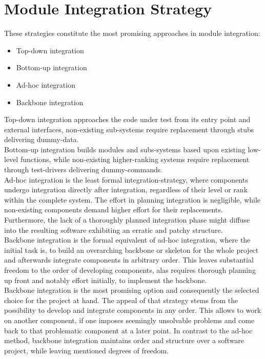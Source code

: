 \documentclass[master,english,smartquotes,apa]{hgbthesis}
\begin{document}
		\section{Module Integration Strategy}
			These strategies constitute the most promising approaches in module integration:
			\begin{itemize} \setlength\itemsep{1px}
			\item Top-down integration 
			\item Bottom-up integration 
			\item Ad-hoc integration 
			\item Backbone integration 
			\end{itemize} 

			Top-down integration approaches the code under test from its entry point and external interfaces, non-existing sub-systems require replacement through stubs delivering dummy-data. \\
			
			Bottom-up integration builds modules and subs-systems based upon existing low-level functions, while non-existing higher-ranking systems require replacement through test-drivers delivering dummy-commands. \\
			
			Ad-hoc integration is the least formal integration-strategy, where components undergo integration directly after integration, regardless of their level or rank within the complete system. The effort in planning integration is negligible, while non-existing components demand higher effort for their replacements. Furthermore, the lack of a thoroughly planned integration phase might diffuse into the resulting software exhibiting an erratic and patchy structure. \\
			
			Backbone integration \cite{Beizer90} is the formal equivalent of ad-hoc integration, where the initial task is, to build an overarching backbone or skeleton for the whole project and afterwards integrate components in arbitrary order. This leaves substantial freedom to the order of developing components, alas requires thorough planning up front and notably effort initially, to implement the backbone. \\

			Backbone integration is the most promising option and consequently the selected choice for the project at hand. The appeal of that strategy stems from the possibility to develop and integrate components in any order. This allows to work on another component, if one imposes seemingly unsolvable problems and come back to that problematic component at a later point. In contrast to the ad-hoc method, backbone integration maintains order and structure over a software project, while leaving mentioned degrees of freedom.
\end{document}
